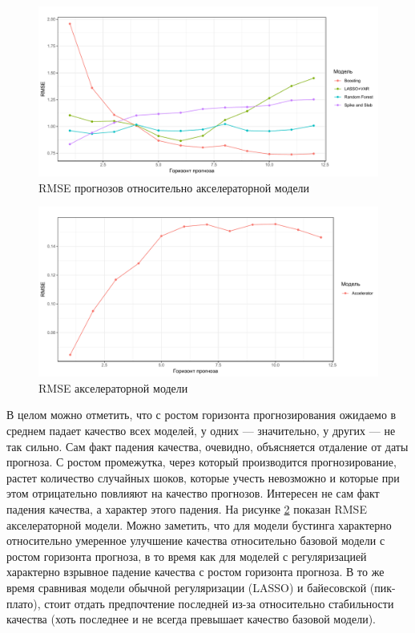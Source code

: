 \begin{figure}[h]
    \centering
    \includegraphics[width = \textwidth]{rmse3.pdf}
    \caption{RMSE прогнозов относительно акселераторной модели}
    \label{fig:rmse3}
\end{figure}
\begin{figure}[h]
    \centering
    \includegraphics[width = \textwidth]{rmse4.pdf}
    \caption{RMSE акселераторной модели}
    \label{fig:rmse4}
\end{figure}




В целом можно отметить, что с ростом горизонта прогнозирования ожидаемо в среднем падает качество всех моделей, у одних --- значительно, у других --- не так сильно. Сам факт падения качества, очевидно, объясняется отдаление от даты прогноза. С ростом промежутка, через который производится прогнозирование, растет количество случайных шоков, которые учесть невозможно и которые при этом отрицательно повлияют на качество прогнозов. Интересен не сам факт падения качества, а характер этого падения. На рисунке \ref{fig:rmse4} показан RMSE акселераторной модели. Можно заметить, что для модели бустинга характерно относительно умеренное улучшение качества относительно базовой модели с ростом горизонта прогноза, в то время как для моделей с регуляризацией характерно взрывное падение качества с ростом горизонта прогноза. В то же время сравнивая модели обычной регуляризации (LASSO) и байесовской (пик-плато), стоит отдать предпочтение последней из-за относительно стабильности качества (хоть последнее и не всегда превышает качество базовой модели).


